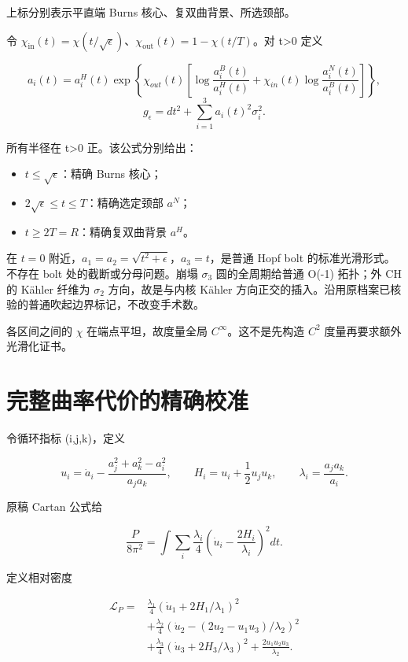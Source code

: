 \documentclass[UTF8,11pt,fontset=none]{ctexart}
\providecommand{\tightlist}{\setlength{\itemsep}{0pt}\setlength{\parskip}{0pt}}
\theoremstyle{definition}
\theoremstyle{remark}
\begin{document}
上标分别表示平直端 Burns 核心、复双曲背景、所选颈部。

令 \(\chi _{\mathrm{in}}(t)=\chi (t/\sqrt{\epsilon })\)、\(\chi _{\mathrm{out}}(t)=1-\chi (t/T)\)。对 t\textgreater0 定义

\[
 a_i(t)=a_i^H(t)\exp\left\{
 \chi_{out}(t)\left[
 \log\frac{a_i^B(t)}{a_i^H(t)}+
 \chi_{in}(t)\log\frac{a_i^N(t)}{a_i^B(t)}
 \right]\right\},
\] \[
 g_\epsilon=dt^2+\sum_{i=1}^3a_i(t)^2\sigma_i^2.
\tag{5.1.1}
\]

所有半径在 t\textgreater0 正。该公式分别给出：

\begin{itemize}
\tightlist
\item
  \(t\le \sqrt{\epsilon }\)：精确 Burns 核心；
\item
  \(2\sqrt{\epsilon }\le t\le T\)：精确选定颈部 \(a^N\)；
\item
  \(t\ge 2T=R\)：精确复双曲背景 \(a^H\)。
\end{itemize}

在 \(t=0\) 附近，\(a_1=a_2=\sqrt{t^2+\epsilon }\)，\(a_3=t\)，是普通 Hopf bolt 的标准光滑形式。不存在 bolt 处的截断或分母问题。崩塌 \(\sigma _3\) 圆的全周期给普通 O(-1) 拓扑；外 CH 的 Kähler 纤维为 \(\sigma _2\) 方向，故是与内核 Kähler 方向正交的插入。沿用原档案已核验的普通吹起边界标记，不改变手术数。

各区间之间的 \(\chi\) 在端点平坦，故度量全局 \(C^\infty\)。这不是先构造 \(C^2\) 度量再要求额外光滑化证书。

\section{完整曲率代价的精确校准}\label{v5-ux5b8cux6574ux66f2ux7387ux4ee3ux4ef7ux7684ux7cbeux786eux6821ux51c6}

令循环指标 (i,j,k)，定义

\[
 u_i=\dot a_i-\frac{a_j^2+a_k^2-a_i^2}{a_ja_k},\qquad
 H_i=u_i+\frac12u_ju_k,\qquad
 \lambda_i=\frac{a_ja_k}{a_i}.
\]

原稿 Cartan 公式给

\[
\frac{P}{8\pi^2}=\int\sum_i\frac{\lambda_i}{4}
 \left(\dot u_i-\frac{2H_i}{\lambda_i}\right)^2dt.
\tag{5.2.1}
\]

定义相对密度

\[
\begin{aligned}
\mathscr L_P={}&\frac{\lambda_1}{4}
(\dot u_1+2H_1/\lambda_1)^2\\
&+\frac{\lambda_2}{4}
(\dot u_2-(2u_2-u_1u_3)/\lambda_2)^2\\
&+\frac{\lambda_3}{4}
(\dot u_3+2H_3/\lambda_3)^2
+\frac{2u_1u_2u_3}{\lambda_2}.
\end{aligned}
\]
\end{document}
